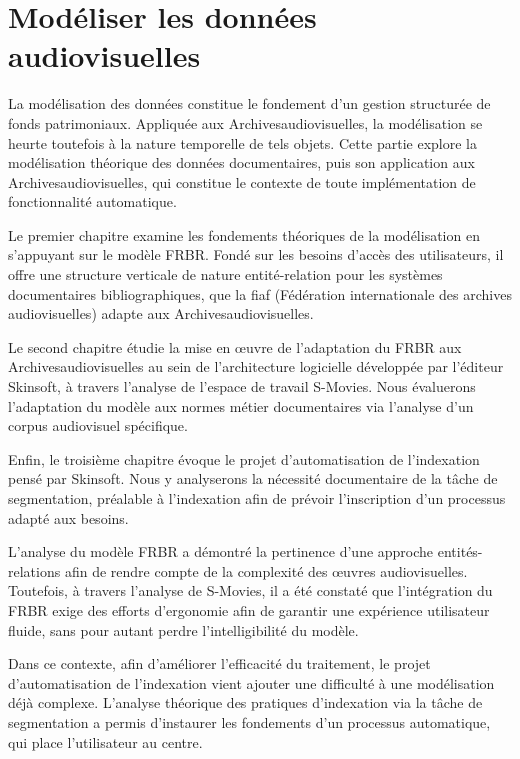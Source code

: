 \documentclass[12pt,twoside]{book}
\begin{document}
	

\part{Modéliser les données audiovisuelles}

La modélisation des données constitue le fondement d'un gestion structurée de fonds patrimoniaux. Appliquée aux \gls{Archivesaudiovisuelles}, la modélisation se heurte toutefois à la nature temporelle de tels objets. Cette partie explore la modélisation théorique des données documentaires, puis son application aux \gls{Archivesaudiovisuelles}, qui constitue le contexte de toute implémentation de fonctionnalité automatique.

Le premier chapitre examine les fondements théoriques de la modélisation en s'appuyant sur le modèle \gls{FRBR}. Fondé sur les besoins d'accès des utilisateurs, il offre une structure verticale de nature entité-relation pour les systèmes documentaires bibliographiques, que la \gls{fiaf} (Fédération internationale des archives audiovisuelles) adapte aux \gls{Archivesaudiovisuelles}.

Le second chapitre étudie la mise en œuvre de l'adaptation du \gls{FRBR} aux \gls{Archivesaudiovisuelles} au sein de l'architecture logicielle développée par l'éditeur Skinsoft, à travers l'analyse de l'espace de travail S-Movies. Nous évaluerons l'adaptation du modèle aux normes métier documentaires via l'analyse d'un corpus audiovisuel spécifique.

Enfin, le troisième chapitre évoque le projet d'automatisation de l'indexation pensé par Skinsoft. Nous y analyserons la nécessité documentaire de la tâche de segmentation, préalable à l'indexation afin de prévoir l'inscription d'un processus adapté aux besoins.









L'analyse du modèle \gls{FRBR} a démontré la pertinence d'une approche entités-relations afin de rendre compte de la complexité des œuvres audiovisuelles. Toutefois, à travers l'analyse de S-Movies, il a été constaté que l'intégration du \gls{FRBR} exige des efforts d'ergonomie afin de garantir une expérience utilisateur fluide, sans pour autant perdre l'intelligibilité du modèle.

Dans ce contexte, afin d'améliorer l'efficacité du traitement, le projet d'automatisation de l'indexation vient ajouter une difficulté à une modélisation déjà complexe. L'analyse théorique des pratiques d'indexation via la tâche de segmentation a permis d'instaurer les fondements d'un processus automatique, qui place l'utilisateur au centre.
\end{document}
